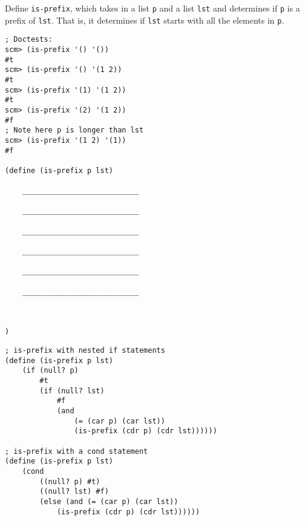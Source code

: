 \begin{blocksection}
\question Define \lstinline$is-prefix$, which takes in a list \lstinline$p$ and a list \lstinline$lst$ and determines 
if \lstinline$p$ is a prefix of \lstinline$lst$.
That is, it determines if \lstinline$lst$ starts with all the elements in \lstinline$p$.

\begin{lstlisting}
; Doctests:
scm> (is-prefix '() '())
#t
scm> (is-prefix '() '(1 2))
#t
scm> (is-prefix '(1) '(1 2))
#t
scm> (is-prefix '(2) '(1 2))
#f
; Note here p is longer than lst
scm> (is-prefix '(1 2) '(1))
#f

(define (is-prefix p lst)

	___________________________
	
	___________________________
	
	___________________________
	
	___________________________
	
	___________________________
	
	___________________________
	


)
\end{lstlisting}
\end{blocksection}

\begin{blocksection}
\begin{solution}[.25in]
\begin{lstlisting}
; is-prefix with nested if statements
(define (is-prefix p lst)
    (if (null? p)
        #t
        (if (null? lst)
            #f
            (and
                (= (car p) (car lst))
                (is-prefix (cdr p) (cdr lst))))))

; is-prefix with a cond statement
(define (is-prefix p lst)
    (cond 
        ((null? p) #t)
        ((null? lst) #f)
        (else (and (= (car p) (car lst))
            (is-prefix (cdr p) (cdr lst))))))
 
\end{lstlisting}
\end{solution}
\end{blocksection}

